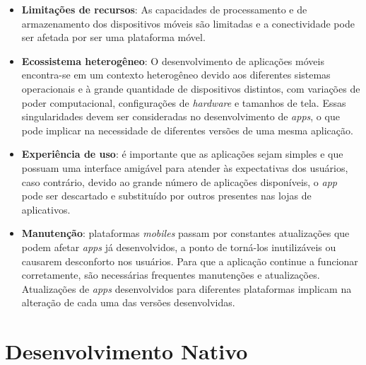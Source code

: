 \begin{itemize}
	
    \item \textbf{Limitações de recursos}: As capacidades de processamento e de armazenamento dos dispositivos móveis são 
    limitadas e a conectividade pode ser afetada por ser uma plataforma móvel. 
    
    \item \textbf{Ecossistema heterogêneo}:   O desenvolvimento de aplicações móveis encontra-se em um contexto heterogêneo 
    devido aos diferentes sistemas operacionais e à grande quantidade de dispositivos distintos, com variações de poder computacional, 
    configurações de \textit{hardware} e tamanhos de tela.
    Essas singularidades devem ser consideradas no desenvolvimento de \textit{apps}, o que  pode implicar na necessidade de 
    diferentes versões de uma mesma aplicação.
    
    \item \textbf{Experiência de uso}: é importante que as aplicações sejam simples e que possuam uma interface amigável 
    para atender às expectativas dos usuários, caso contrário, devido ao grande número de aplicações disponíveis, o \textit{app} pode ser descartado e substituído por outros presentes nas lojas de aplicativos.
    
    \item \textbf{Manutenção}: plataformas \textit{mobiles} passam por constantes atualizações que podem afetar 
    \textit{apps} já desenvolvidos, a ponto de torná-los inutilizáveis ou causarem desconforto nos usuários. 
    Para que a aplicação continue a funcionar corretamente, são necessárias frequentes manutenções e atualizações.
    Atualizações de \textit{apps} desenvolvidos para diferentes plataformas implicam na alteração de cada uma das versões desenvolvidas.
    
\end{itemize}

\section{Desenvolvimento Nativo} \label{section:desenvolvimentonativo}

